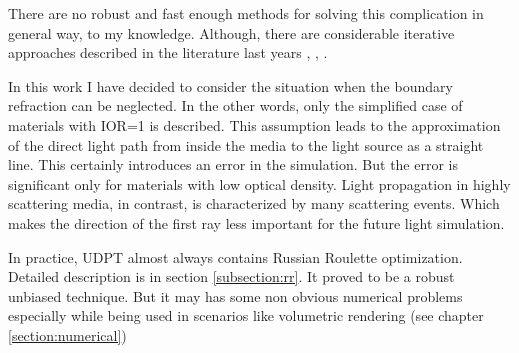 There are no robust and fast enough methods for solving this complication in general way, to my
knowledge. Although, there are considerable iterative approaches described in the literature
last years \cite{holzschuch:hal-01083246}, \cite{10.1111:cgf.12681}, \cite{Koerner2016}.

In this work I have decided to consider the situation when the boundary refraction can be neglected.
In the other words, only the simplified case of materials with \gls{IOR}=1 is described.
This assumption leads to the approximation of the direct light path from inside the media to the
light source as a straight line. This certainly introduces an error in the simulation.
But the error is significant only for materials with low optical density. Light propagation in
highly scattering media, in contrast, is characterized by many scattering events. Which makes the
direction of the first ray less important for the future light simulation.

In practice, \gls{UDPT} almost always contains Russian Roulette optimization. Detailed description
is in section \ref{subsection:rr}. It proved to be a robust unbiased technique. But it may has some
non obvious numerical problems especially while being used in scenarios like volumetric rendering
(see chapter \ref{section:numerical})

